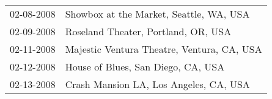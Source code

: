 \begin{supertabular}{ll}
 02-08-2008 &     Showbox at the Market, Seattle, WA, USA \\
 02-09-2008 &         Roseland Theater, Portland, OR, USA \\
 02-11-2008 &  Majestic Ventura Theatre, Ventura, CA, USA \\
 02-12-2008 &          House of Blues, San Diego, CA, USA \\
 02-13-2008 &      Crash Mansion LA, Los Angeles, CA, USA \\
\end{supertabular}
